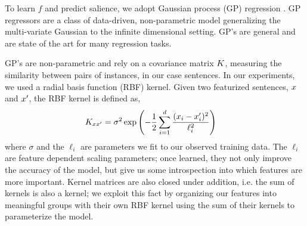 To learn $f$ and predict salience,
we adopt Gaussian process (GP) regression 
\cite{rasmussen:gaussian-process-book}.  GP regressors are a
class of data-driven, non-parametric model generalizing the multi-variate
Gaussian to the infinite dimensional setting.  GP's are general
and are state of the art for many regression tasks.  


GP's are non-parametric and rely on a covariance matrix $K$, measuring the similarity between pairs of instances, in our 
case sentences.  In our experiments, we used a radial basis 
function (RBF) kernel.  Given two featurized sentences, 
$x$ and $x^\prime$, the RBF kernel is defined as,
\begin{align*}
        K_{xx^\prime}&= \sigma^2 \exp\left(- \frac{1}{2} 
\sum_{i=1}^{d} \frac{ (x_{i}-x_{i}^\prime)^2}{\ell_i^2} \right)
\end{align*}
where $\sigma$ and the $\ell_i$ are parameters we fit to our observed training data. The $\ell_i$ are feature dependent scaling parameters; once learned, they not only improve the accuracy of the model, but give us some introspection  into which features are more important.
Kernel matrices are also closed under addition, i.e. the sum of kernels
is also a kernel; we exploit this fact by organizing our features into 
meaningful groups with their own RBF kernel using the sum of their kernels 
to parameterize the model.


